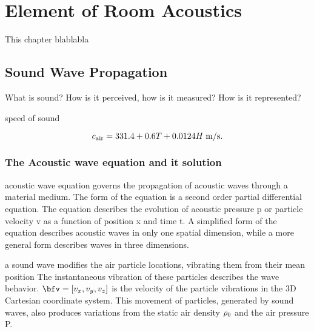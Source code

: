 \chapter{Element of Room Acoustics}\label{chap:acoustics}

 This chapter blablabla

\section{Sound Wave Propagation}
What is sound? How is it perceived, how is it measured? How is it represented?

speed of sound

\begin{equation}
    c_\text{air} =  331.4 + 0.6T + 0.0124H \; \text{m/s}
    .
\end{equation}

\subsection{The Acoustic wave equation and it solution}
\label{subsec:acoustics:waveq}
acoustic wave equation governs the propagation of acoustic waves through a material medium.
The form of the equation is a second order partial differential equation.
The equation describes the evolution of acoustic pressure p or particle velocity v as a function of position x and time t.
A simplified form of the equation describes acoustic waves in only one spatial dimension, while a more general form describes waves in three dimensions.

a sound wave modifies the air particle locations, vibrating them from their mean position
The instantaneous vibration of these particles describes the wave behavior.
$\bfv = \klist{v_x, v_y, v_z}$ is the velocity of the particle vibrations in the 3D Cartesian coordinate system.
This movement of particles, generated by sound waves, also produces variations from the static air density $\rho_0$ and the air pressure P.



